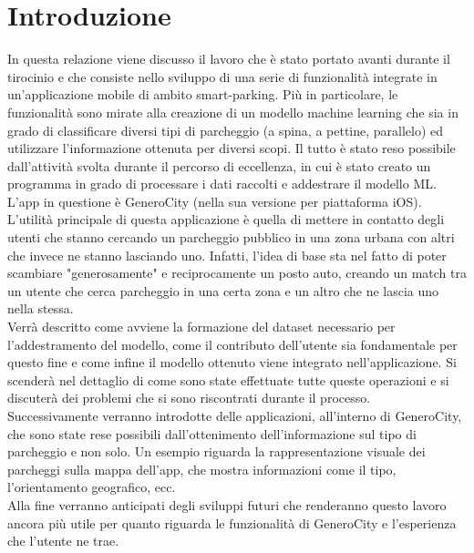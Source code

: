 \chapter{Introduzione} 
In questa relazione viene discusso il lavoro che è stato
portato avanti durante il tirocinio e che consiste nello
sviluppo di una serie di funzionalità integrate in un'applicazione
mobile di ambito smart-parking. Più in particolare, le funzionalità
sono mirate alla creazione di un modello machine learning che
sia in grado di classificare diversi tipi di parcheggio (a spina,
a pettine, parallelo) ed utilizzare l'informazione ottenuta 
per diversi scopi. Il tutto è stato reso possibile dall'attività
svolta durante il percorso di eccellenza, in cui è stato creato
un programma in grado di processare i dati raccolti e addestrare il 
modello ML.\\
L'app in questione è GeneroCity (nella sua versione per piattaforma
iOS). L'utilità principale di questa applicazione è quella di 
mettere in contatto degli utenti che stanno cercando un parcheggio
pubblico in una zona urbana con altri che invece ne stanno lasciando
uno. Infatti, l'idea di base sta nel fatto di poter scambiare
"generosamente" e reciprocamente un posto auto, creando un match tra un utente
che cerca parcheggio in una certa zona e un altro che ne lascia uno
nella stessa.\\
Verrà descritto come avviene la formazione del dataset necessario per
l'addestramento del modello, come il contributo dell'utente sia 
fondamentale per questo fine e come infine il modello ottenuto viene
integrato nell'applicazione. Si scenderà nel dettaglio di come sono
state effettuate tutte queste operazioni e si discuterà dei problemi
che si sono riscontrati durante il processo.\\
Successivamente verranno introdotte delle applicazioni, all'interno di 
GeneroCity, che sono state rese possibili dall'ottenimento 
dell'informazione sul tipo di parcheggio e non solo. Un esempio
riguarda la rappresentazione visuale dei parcheggi sulla mappa
dell'app, che mostra informazioni come il tipo, l'orientamento geografico, ecc.\\
Alla fine verranno anticipati degli sviluppi futuri che renderanno
questo lavoro ancora più utile per quanto riguarda le funzionalità
di GeneroCity e l'esperienza che l'utente ne trae.